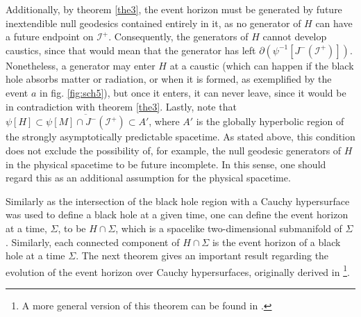 \documentclass[
12pt,		%
openright,	%
twoside,  %
a4paper,			%
chapter=TITLE,		%
english,			%
french,				%
spanish,			%
brazil				%
]{USPSC-classe/USPSC}
\begin{document}
Additionally, by theorem \ref{the3}, the event horizon must be generated by future inextendible null geodesics contained entirely in it, as no generator of $H$ can have a future endpoint on $\mathscr{I^+}$. Consequently, the generators of $H$ cannot develop caustics, since that would mean that the generator has left $\partial(\psi^{-1}[J^-(\mathscr{I^+})])$. Nonetheless, a generator may enter $H$ at a caustic (which can happen if the black hole absorbs matter or radiation, or when it is formed, as exemplified by the event $a$ in fig. \ref{fig:sch5}), but once it enters, it can never leave, since it would be in contradiction with theorem \ref{the3}. Lastly, note that $\psi[H]\subset\overline{\psi[M]\cap J^-(\mathscr{I^+})}\subset A'$, where $A'$ is the globally hyperbolic region of the strongly asymptotically predictable spacetime. As stated above, this condition does not exclude the possibility of, for example, the null geodesic generators of $H$ in the physical spacetime to be future incomplete. In this sense, one should regard this as an additional assumption for the physical spacetime.

Similarly as the intersection of the black hole region with a Cauchy hypersurface was used to define a black hole at a given time, one can define the event horizon at a time, $\Sigma$, to be $ H\cap \Sigma$, which is a spacelike two-dimensional submanifold of $\Sigma$. Similarly, each connected component of $ H\cap \Sigma$ is the event horizon of a black hole at a time $\Sigma$. The next theorem gives an important result regarding the evolution of the event horizon over Cauchy hypersurfaces, originally derived in \cite{Hawking1971}\footnote{A more general version of this theorem can be found in \cite{Chruściel2001}.}.
\end{document}
